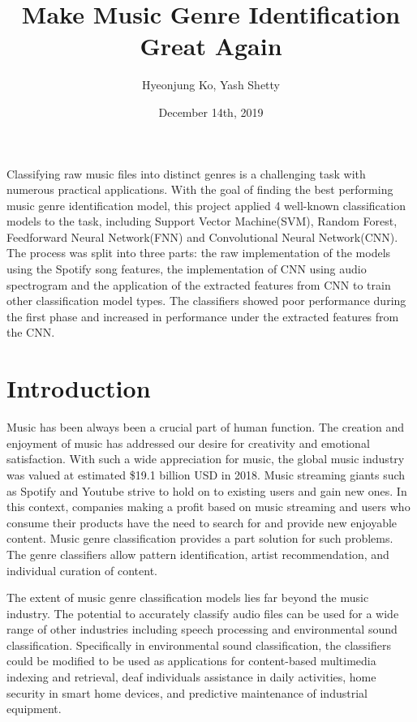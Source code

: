 \documentclass[11.5pt]{article}
\title{Make Music Genre Identification Great Again}
\author{Hyeonjung Ko, Yash Shetty}
\date{December 14th, 2019}
\begin{document}
\maketitle

\abstract
Classifying raw music files into distinct genres is a challenging task with numerous practical applications. With the goal of finding the best performing music genre identification model, this project applied 4 well-known classification models to the task, including Support Vector Machine(SVM), Random Forest, Feedforward Neural Network(FNN) and Convolutional Neural Network(CNN). The process was split into three parts: the raw implementation of the models using the Spotify song features, the implementation of CNN using audio spectrogram and the application of the extracted features from CNN to train other classification model types. The classifiers showed poor performance during the first phase and increased in performance under the extracted features from the CNN.\\
\vspace{2mm}
\section{Introduction}

Music has been always been a crucial part of human function. The creation and enjoyment of music has addressed our desire for creativity and emotional satisfaction. With such a wide appreciation for music, the global music industry was valued at estimated \$19.1 billion USD in 2018. Music streaming giants such as Spotify and Youtube strive to hold on to existing users and gain new ones. In this context, companies making a profit based on music streaming and users who consume their products have the need to search for and provide new enjoyable content. Music genre classification provides a part solution for such problems. The genre classifiers allow pattern identification, artist recommendation, and individual curation of content.

The extent of music genre classification models lies far beyond the music industry. The potential to accurately classify audio files can be used for a wide range of other industries including speech processing and environmental sound classification. Specifically in environmental sound classification, the classifiers could be modified to be used as applications for content-based multimedia indexing and retrieval, deaf individuals assistance in daily activities, home security in smart home devices, and predictive maintenance of industrial equipment. 
\end{document}
